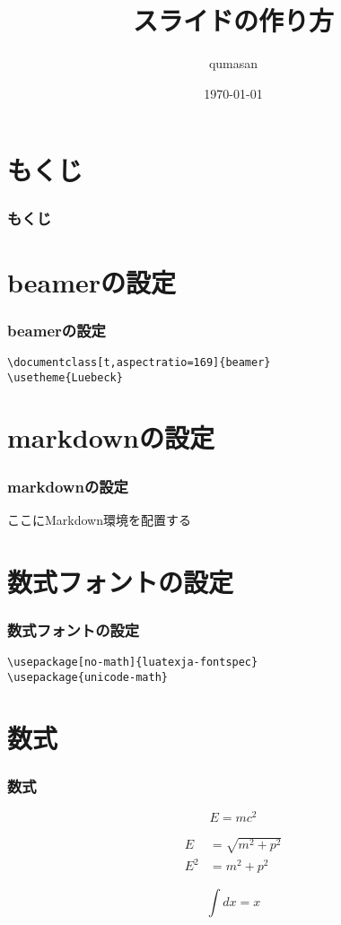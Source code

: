 \documentclass[t,aspectratio=169]{beamer}
\title{スライドの作り方}
\author{qumasan}
\institute{KumaROOT}
\date{\today}
\begin{document}
\begin{frame}
\titlepage
\end{frame}

\section*{もくじ}
\begin{frame}
    \frametitle{もくじ}
    \tableofcontents
\end{frame}

\section{beamerの設定}
\begin{frame}[fragile]
    \frametitle{beamerの設定}
    \begin{verbatim}
\documentclass[t,aspectratio=169]{beamer}
\usetheme{Luebeck}
    \end{verbatim}
\end{frame}

\section{markdownの設定}
\begin{frame}
    \frametitle{markdownの設定}
ここにMarkdown環境を配置する
\end{frame}



\section{数式フォントの設定}
\begin{frame}[fragile]
    \frametitle{数式フォントの設定}
    \begin{verbatim}
\usepackage[no-math]{luatexja-fontspec}
\usepackage{unicode-math}
    \end{verbatim}
\end{frame}

\section{数式}
\begin{frame}
    \frametitle{数式}
    \begin{equation}
        E = mc^{2}
    \end{equation}

    \begin{align}
        E &= \sqrt{m^{2} + p^{2}}\\
        E^{2} &= m^{2} + p^{2}
    \end{align}

    \begin{equation}
    ∫dx = x
    \end{equation}

\end{frame}
\end{document}
